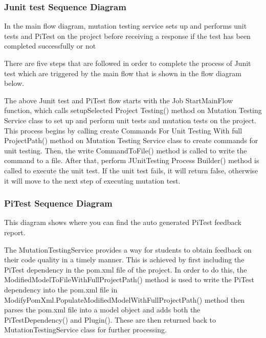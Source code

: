 \subsubsection{Junit test Sequence Diagram}
In the main flow diagram, mutation testing service sets up and performs unit tests and PiTest on the project before receiving a response if the test has been completed successfully or not
\par
There are five steps that are followed in order to complete the process of Junit test which are triggered by the main flow that is shown in the flow diagram below.\par 
The above Junit test and PiTest flow starts with the Job StartMainFlow function, which calls setupSelected Project Testing() method on Mutation Testing Service class to set up and perform unit tests and mutation tests on the project. This process begins by calling create Commands For Unit Testing With full ProjectPath() method on Mutation Testing Service class to create commands for unit testing. Then, the write CommandToFile() method is called to write the command to a file. After that, perform JUnitTesting Process Builder() method is called to execute the unit test. If the unit test fails, it will return false, otherwise it will move to the next step of executing mutation test.

\subsubsection{PiTest Sequence Diagram}
This diagram shows where you can find the auto generated PiTest feedback report.\par 
The MutationTestingService provides a way for students to obtain feedback on their code quality in a timely manner. This is achieved by first including the PiTest dependency in the pom.xml file of the project. In order to do this, the ModifiedModelToFileWithFullProjectPath() method is used to write the PiTest dependency into the pom.xml file in ModifyPomXml.PopulateModifiedModelWithFullProjectPath() method then parses the pom.xml file into a model object and adds both the PiTestDependency() and Plugin(). These are then returned back to MutationTestingService class for further processing.\par 

